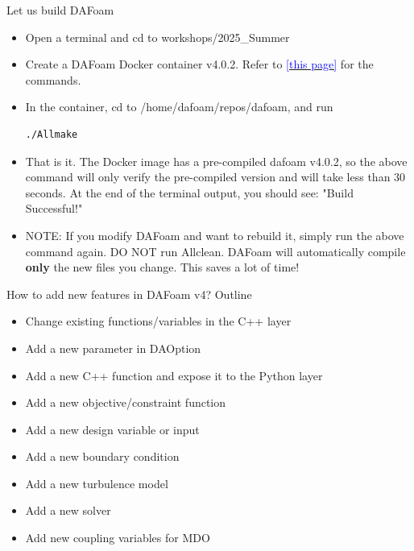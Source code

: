 \documentclass{bredelebeamer}
\begin{document}
\begin{frame}[fragile]{Let us build DAFoam}


\begin{itemize}
  \setlength\itemsep{0.5em}
  \item Open a terminal and cd to workshops/2025\_Summer
 \item Create a DAFoam Docker container v4.0.2. Refer to \href{https://dafoam.github.io/mydoc_get_started_run.html}{\textcolor{blue}{[this page]}} for the commands.
 \item In the container, cd to /home/dafoam/repos/dafoam, and run
 \begin{lstlisting}
./Allmake
 \end{lstlisting}
 \item That is it. The Docker image has a pre-compiled dafoam v4.0.2, so the above command will only verify the pre-compiled version and will take less than 30 seconds. At the end of the terminal output, you should see: "Build Successful!"
 \item NOTE: If you modify DAFoam and want to rebuild it, simply run the above command again. DO NOT run Allclean. DAFoam will automatically compile \textbf{only} the new files you change. This saves a lot of time!
\end{itemize}
  
\end{frame}


\begin{frame}{How to add new features in DAFoam v4?}
  Outline
  \begin{itemize}
  \item Change existing functions/variables in the C++ layer
  \item Add a new parameter in DAOption
  \item Add a new C++ function and expose it to the Python layer
  \item Add a new objective/constraint function
  \item Add a new design variable or input
  \item Add a new boundary condition
  \item Add a new turbulence model
  \item Add a new solver
  \item Add new coupling variables for MDO
    
\end{itemize}
\end{frame}
\end{document}
